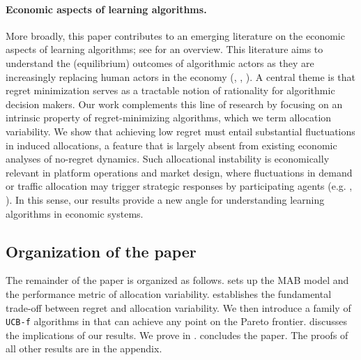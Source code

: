 \documentclass[nonblindrev]{informs3_noinforms}
\begin{document}
\paragraph{Economic aspects of learning algorithms.}
More broadly, this paper contributes to an emerging literature on the economic aspects of learning algorithms; see \cite{hartline2026ec} for an overview. This literature aims to understand the (equilibrium) outcomes of algorithmic actors as they are increasingly replacing human actors in the economy (\cite{foster1997calibrated}, \cite{hart2000simple}, \cite{calvano2020artificial}). A central theme is that regret minimization serves as a tractable notion of rationality for algorithmic decision makers. Our work complements this line of research by focusing on an intrinsic property of regret-minimizing algorithms, which we term allocation variability. We show that achieving low regret must entail substantial fluctuations in induced allocations, a feature that is largely absent from existing economic analyses of no-regret dynamics. Such allocational instability is economically relevant in platform operations and market design, where fluctuations in demand or traffic allocation may trigger strategic responses by participating agents (e.g. \cite{lee1997bullwhip}, \cite{cachon2017role}). In this sense, our results provide a new angle for understanding learning algorithms in economic systems.\\
\subsection{Organization of the paper}
The remainder of the paper is organized as follows. { sets up the MAB model and the performance metric of allocation variability.  establishes the fundamental trade-off between regret and allocation variability. We then introduce a family of \texttt{UCB-f} algorithms in  that can achieve any point on the Pareto frontier.  discusses the implications of our results. We prove  in .  concludes the paper. The proofs of all other results are in the appendix.}
\end{document}
